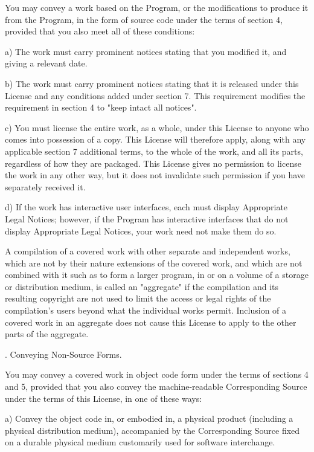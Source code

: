 You may convey a work based on the Program, or the modifications to
produce it from the Program, in the form of source code under the
terms of section 4, provided that you also meet all of these conditions:

a) The work must carry prominent notices stating that you modified
it, and giving a relevant date.

b) The work must carry prominent notices stating that it is
released under this License and any conditions added under section
7.  This requirement modifies the requirement in section 4 to
"keep intact all notices".

c) You must license the entire work, as a whole, under this
License to anyone who comes into possession of a copy.  This
License will therefore apply, along with any applicable section 7
additional terms, to the whole of the work, and all its parts,
regardless of how they are packaged.  This License gives no
permission to license the work in any other way, but it does not
invalidate such permission if you have separately received it.

d) If the work has interactive user interfaces, each must display
Appropriate Legal Notices; however, if the Program has interactive
interfaces that do not display Appropriate Legal Notices, your
work need not make them do so.

A compilation of a covered work with other separate and independent
works, which are not by their nature extensions of the covered work,
and which are not combined with it such as to form a larger program,
in or on a volume of a storage or distribution medium, is called an
"aggregate" if the compilation and its resulting copyright are not
used to limit the access or legal rights of the compilation's users
beyond what the individual works permit.  Inclusion of a covered work
in an aggregate does not cause this License to apply to the other
parts of the aggregate.

. Conveying Non-Source Forms.

You may convey a covered work in object code form under the terms
of sections 4 and 5, provided that you also convey the
machine-readable Corresponding Source under the terms of this License,
in one of these ways:

a) Convey the object code in, or embodied in, a physical product
(including a physical distribution medium), accompanied by the
Corresponding Source fixed on a durable physical medium
customarily used for software interchange.


